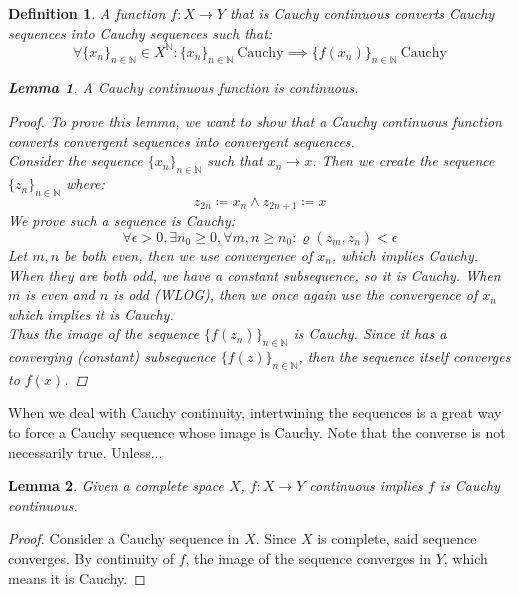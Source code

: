 \documentclass{exam}
\newtheorem{lem}{Lemma}[section]
\newtheorem{defn}{Definition}[section]
\begin{document}
\begin{defn}
A function $f: X \xrightarrow{} Y$ that is Cauchy continuous converts Cauchy sequences into Cauchy sequences such that:
\begin{equation*}
  \forall \{x_n\}_{n \in \mathbb{N}} \in X^\mathbb{N}: \{x_n\}_{n \in \mathbb{N}} \ \text{Cauchy} \implies \{f(x_n)\}_{n \in \mathbb{N}} \ \text{Cauchy}
\end{equation*}
\begin{lem}
A Cauchy continuous function is continuous.
\end{lem}
\begin{proof}
To prove this lemma, we want to show that a Cauchy continuous function converts convergent sequences into convergent sequences.\\

Consider the sequence $\{x_n\}_{n \in \mathbb{N}}$ such that $x_n \xrightarrow{} x$. Then we create the sequence $\{z_n\}_{n \in \mathbb{N}}$ where:
\begin{equation*}
  z_{2n} \coloneq x_n \land z_{2n+1} \coloneq x
\end{equation*} 
We prove such a sequence is Cauchy:
\begin{equation}
  \forall \epsilon > 0, \exists n_0 \geqslant 0, \forall m, n \geqslant n_0: \varrho(z_m, z_n) < \epsilon
\end{equation}
Let $m, n$ be both even, then we use convergence of $x_n$, which implies Cauchy. When they are both odd, we have a constant subsequence, so it is Cauchy. When $m$ is even and $n$ is odd (WLOG), then we once again use the convergence of $x_n$ which implies it is Cauchy.\\

Thus the image of the sequence $\{f(z_n)\}_{n \in \mathbb{N}}$ is Cauchy. Since it has a converging (constant) subsequence $\{f(z)\}_{n \in \mathbb{N}}$, then the sequence itself converges to $f(x)$.
\end{proof}
\end{defn}
When we deal with Cauchy continuity, intertwining the sequences is a great way to force a Cauchy sequence whose image is Cauchy. Note that the converse is not necessarily true. Unless...
\begin{lem}
Given a complete space $X$, $f: X \xrightarrow{} Y$ continuous implies $f$ is Cauchy continuous.
\end{lem}
\begin{proof}
Consider a Cauchy sequence in $X$. Since $X$ is complete, said sequence converges. By continuity of $f$, the image of the sequence converges in $Y$, which means it is Cauchy. 
\end{proof}
\end{document}
